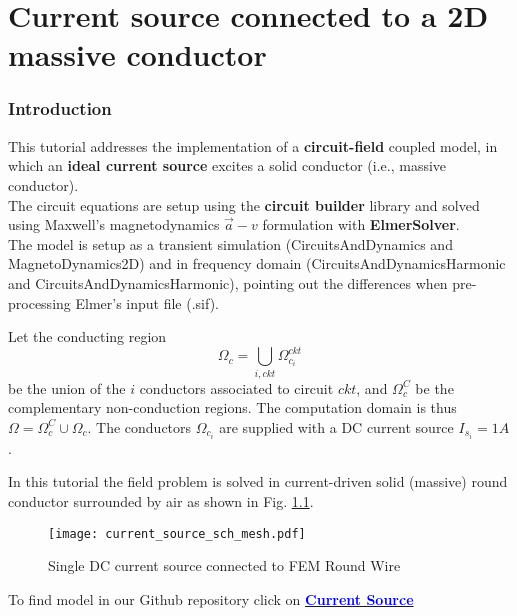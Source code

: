 \chapter{Current source connected to a 2D massive conductor}



\subsection*{Introduction}

This tutorial addresses the implementation of a \textbf{circuit-field} coupled model, in which an \textbf{ideal current source} excites a solid conductor (i.e., massive conductor). \\
The circuit equations are setup using the \textbf{circuit builder} library and solved using Maxwell's magnetodynamics $\vec a-v $ formulation with \textbf{ElmerSolver}. 
\\
The model is setup as a transient simulation (CircuitsAndDynamics and MagnetoDynamics2D) and in frequency domain (CircuitsAndDynamicsHarmonic and CircuitsAndDynamicsHarmonic), pointing out the differences when pre-processing  Elmer's input file (.sif).


Let the conducting region
$$
\Omega_{c} = \bigcup_{i,ckt} \Omega_{c_i}^{ckt}
$$ 
be the union of the $i$ conductors associated to circuit $ckt$,
and $\Omega_{c}^C$ be the complementary non-conduction regions.
The computation domain is thus
$\Omega = \Omega_{c}^C \cup \Omega_{c}$.
The conductors $\Omega_{c_i}$ are supplied
with a DC current source $I_{s_{i}} =1A$.

In this tutorial the field problem is solved in current-driven solid (massive) round conductor surrounded by air as shown in Fig. \ref{fg:dc_current_source_mesh}.

\begin{figure}[H]
\centering
\texttt{[image: current\_source\_sch\_mesh.pdf]}
\caption{Single DC current source connected to FEM Round Wire }\label{fg:dc_current_source_mesh}
\end{figure}  

To find model in our Github repository click on \href{https://github.com/ElmerCSC/elmer-elmag/tree/main/CircuitBuilder/current_source}{\textcolor{blue}{\textbf{Current Source}}}

